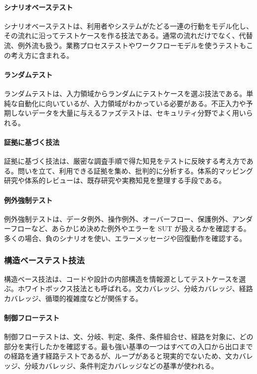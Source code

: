 \documentclass[a4paper,11pt]{ltjsarticle}
\numberwithin{figure}{section}
\numberwithin{table}{section}
\begin{document}
\paragraph{シナリオベーステスト}
シナリオベーステストは、利用者やシステムがたどる一連の行動をモデル化し、その流れに沿ってテストケースを作る技法である。通常の流れだけでなく、代替流、例外流も扱う。業務プロセステストやワークフローモデルを使うテストもこの考え方に含まれる。

\paragraph{ランダムテスト}
ランダムテストは、入力領域からランダムにテストケースを選ぶ技法である。単純な自動化に向いているが、入力領域がわかっている必要がある。不正入力や予期しないデータを大量に与えるファズテストは、セキュリティ分野でよく用いられる。

\paragraph{証拠に基づく技法}
証拠に基づく技法は、厳密な調査手順で得た知見をテストに反映する考え方である。問いを立て、利用できる証拠を集め、批判的に分析する。体系的マッピング研究や体系的レビューは、既存研究や実務知見を整理する手段である。

\paragraph{例外強制テスト}
例外強制テストは、データ例外、操作例外、オーバーフロー、保護例外、アンダーフローなど、あらかじめ決めた例外やエラーを SUT が扱えるかを確認する。多くの場合、負のシナリオを使い、エラーメッセージや回復動作を確認する。

\subsubsection{構造ベーステスト技法}
構造ベース技法は、コードや設計の内部構造を情報源としてテストケースを選ぶ。ホワイトボックス技法とも呼ばれる。文カバレッジ、分岐カバレッジ、経路カバレッジ、循環的複雑度などが関係する。

\paragraph{制御フローテスト}
制御フローテストは、文、分岐、判定、条件、条件組合せ、経路を対象に、どの部分を実行したかを確認する。最も強い基準の一つはすべての入口から出口までの経路を通す経路テストであるが、ループがあると現実的でないため、文カバレッジ、分岐カバレッジ、条件判定カバレッジなどの基準が使われる。
\end{document}
